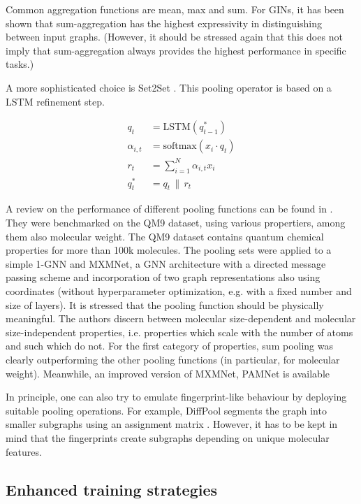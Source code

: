 Common aggregation functions are mean, max and sum. For GINs, it has been shown that sum-aggregation has the highest expressivity in distinguishing between input graphs.
(However, it should be stressed again that this does not imply that sum-aggregation always provides the highest performance in specific tasks.)

A more sophisticated choice is Set2Set \cite{Vinyals.19.11.2015}. This pooling operator is based on a LSTM refinement step.

\begin{align*}
q_t &= \text{LSTM}(q_{t-1}^*) \\
\alpha_{i,t} &= \text{softmax}(x_i \cdot q_t) \\
r_t &= \sum_{i=1}^N \alpha_{i,t} x_i \\
q_t^* &= q_t \, \| \, r_t
\end{align*}

A review on the performance of different pooling functions can be found in \cite{Schweidtmann.2023}. They were benchmarked on the QM9 dataset, using various propertiers, among them also molecular weight. The QM9 dataset contains quantum chemical properties for more than 100k molecules. The pooling sets were applied to a simple 1-GNN and MXMNet, a GNN architecture with a directed message passing scheme and incorporation of two graph representations also using coordinates \cite{Zhang.15.11.2020}  (without hyperparameter optimization, e.g. with a fixed number and size of layers). It is stressed that the pooling function should be physically meaningful. The authors discern between molecular size-dependent and molecular size-independent properties, i.e. properties which scale with the number of atoms and such which do not. For the first category of properties, sum pooling was clearly outperforming the other pooling functions (in particular, for molecular weight).
Meanwhile, an improved version of MXMNet, PAMNet is available \cite{Zhang.2023}

In principle, one can also try to emulate fingerprint-like behaviour by deploying suitable pooling operations. 
For example, DiffPool segments the graph into smaller subgraphs using an assignment matrix \cite{Ying.22.06.2018}.
However, it has to be kept in mind that the fingerprints create subgraphs depending on unique molecular features.

\subsection{Enhanced training strategies}

